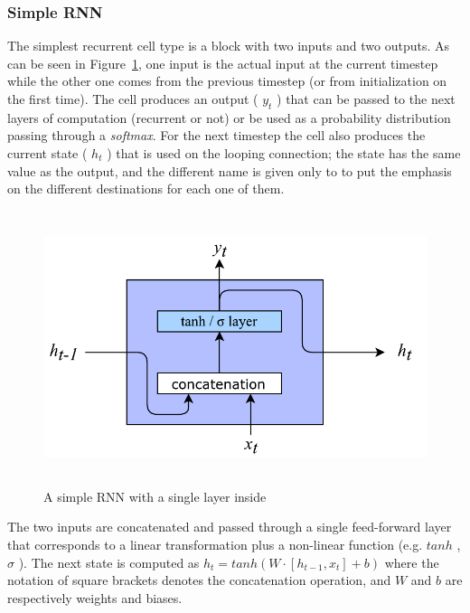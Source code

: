 \subsubsection{Simple RNN}
The simplest recurrent cell type is a block with two inputs and two outputs. As can be seen in Figure~\ref{fig:simpleRNN}, one input is the actual input at the current timestep while the other one comes from the previous timestep (or from initialization on the first time). The cell produces an output ( \( y_{t} \) ) that can be passed to the next layers of computation (recurrent or not) or be used as a probability distribution passing through a \textit{softmax}. For the next timestep the cell also produces the current state ( \( h_{t} \) ) that is used on the looping connection; the state has the same value as the output, and the different name is given only to to put the emphasis on the different destinations for each one of them.


\begin{figure}[!htbp]
    \centering
    \includegraphics[max width=\linewidth,max height=8cm,keepaspectratio]{figures/simpleRNN}
    \caption{A simple RNN with a single layer inside}\label{fig:simpleRNN}
\end{figure}

The two inputs are concatenated and passed through a single feed-forward layer that corresponds to a linear transformation plus a non-linear function (e.g.  \( tanh \) ,  \(  \sigma  \) ). The next state is computed as  \( h_{t}=tanh \left( W\cdot  \left[ h_{t-1}, x_{t} \right]  + b \right)  \)  where the notation of square brackets denotes the concatenation operation, and  \( W \)  and  \( b \)  are respectively weights and biases.

